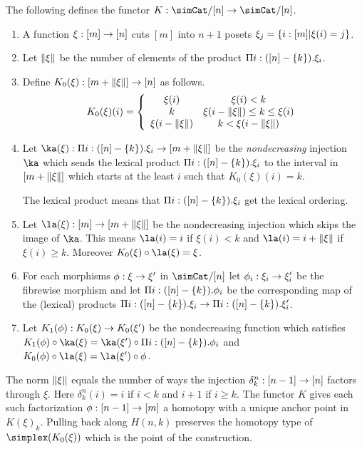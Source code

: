 \begin{definition}
The following defines the functor $K\of\simCat/[n]\to\simCat/[n]$.
\begin{enumerate}
\item A function $\xi:[m]\to[n]$ cuts $[m]$ into $n+1$ posets $\xi_j = \left\{i:[m]|\xi(i)=j\right\}$. 
\item Let $\Vert \xi \Vert$ be the number of elements of the product $\Pi i: ([n]-\left\{k\right\}).\xi_i$. 
\item Define $K_0(\xi): [m+\Vert \xi \Vert]\to [n]$ as follows.
\[ 
	K_0(\xi)(i) = \left\{
		\begin{array}{cc}
			\xi(i) & \xi(i)<k \\
			k & \xi(i-\Vert \xi \Vert)\leq k \leq \xi(i)\\
			\xi(i-\Vert \xi \Vert) & k<\xi(i-\Vert \xi \Vert)
		\end{array}
	\right.
\]
\item Let $\ka(\xi)\of\Pi i\of([n]-\set k).\xi_i \to [m+\norm\xi]$ be the \emph{nondecreasing} injection $\ka$ which sends the lexical product $\Pi i:([n]-\left\{k\right\}).\xi_i$ to the interval in $[m+\Vert \xi \Vert]$ which starts at the least $i$ such that $K_0(\xi)(i)=k$.

The lexical product means that $\Pi i:([n]-\left\{k\right\}).\xi_i$ get the lexical ordering. %

\item Let $\la(\xi)\of[m]\to[m+\norm\xi]$ be the nondecreasing injection which skips the image of $\ka$. This means $\la(i)=i$ if $\xi(i)<k$ and $\la(i)=i+\norm\xi$ if $\xi(i)\geq k$. Moreover $K_0(\xi)\circ\la(\xi) = \xi$.
\item For each morphisms $\phi:\xi\to\xi'$ in $\simCat/[n]$ let $\phi_i:\xi_i\to\xi'_i$ be the fibrewise morphism and let $\Pi i:([n]-\left\{k\right\}).\phi_i$ be the corresponding map of the (lexical) products $\Pi i:([n]-\left\{k\right\}).\xi_i\to\Pi i:([n]-\left\{k\right\}).\xi'_i$.
\item Let $K_1(\phi): K_0(\xi)\to K_0(\xi')$ be the nondecreasing function which satisfies $K_1(\phi)\circ \ka(\xi) = \ka(\xi')\circ \Pi i\of([n]-\set k).\phi_i$ and $K_0(\phi)\circ \la(\xi) = \la(\xi')\circ \phi$.
\end{enumerate}
\end{definition}

The norm $\Vert \xi \Vert$ equals the number of ways the injection $\delta^n_k:[n-1]\to[n]$ factors through $\xi$. Here $\delta^n_k(i)=i$ if $i<k$ and $i+1$ if $i\geq k$. The functor $K$ gives each such factorization $\phi:[n-1]\to [m]$ a homotopy with a unique anchor point in $K(\xi)_k$.  Pulling back along $H(n,k)$ preserves the homotopy type of $\simplex(K_0(\xi))$ which is the point of the construction. %


